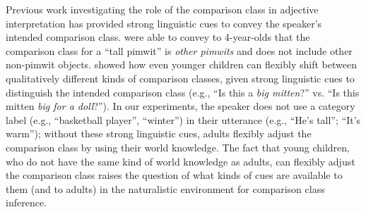 \documentclass[doc, floatsintext]{apa6}
\newcommand{\mht}[1]{\textcolor{Blue}{[mht: #1]}}
\begin{document}
Previous work investigating the role of the comparison class in adjective interpretation has provided strong linguistic cues to convey the speaker's intended comparison class.
 were able to convey to 4-year-olds that the comparison class for a ``tall pimwit'' is \emph{other pimwits} and does not include other non-pimwit objects.
 showed how even younger children can flexibly shift between qualitatively different kinds of comparison classes, given strong linguistic cues to distinguish the intended comparison class (e.g., ``Is this a \emph{big mitten}?'' vs. ``Is this mitten \emph{big for a doll}?'').
In our experiments, the speaker does not use a category label (e.g., ``basketball player'', ``winter'') in their utterance (e.g., ``He's tall''; ``It's warm''); without these strong linguistic cues, adults flexibly adjust the comparison class by using their world knowledge.
The fact that young children, who do not have the same kind of world knowledge as adults, can flexibly adjust the comparison class raises the question of what kinds of cues are available to them (and to adults) in the naturalistic environment for comparison class inference.

\end{document}
